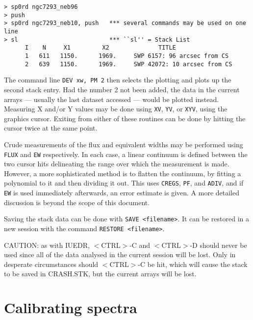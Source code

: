 \begin{verbatim}
> sp0rd ngc7293_neb96
> push
> sp0rd ngc7293_neb10, push   *** several commands may be used on one line
> sl                          *** ``sl'' = Stack List
      I    N     X1         X2              TITLE
      1   611   1150.      1969.     SWP 6157: 96 arcsec from CS
      2   639   1150.      1969.     SWP 42072: 10 arcsec from CS
\end{verbatim}

The command line \verb+DEV xw, PM 2+ then selects the plotting and plots
up the second stack entry.  Had the number 2 not been added, the data in the
current arrays --- usually the last dataset accessed --- would be plotted
instead.  Measuring X and/or Y values may be done using \verb+XV+, \verb+YV+,
or \verb+XYV+, using the graphics cursor.  Exiting from either of these
routines can be done by hitting the cursor twice at the same point.

Crude measurements of the flux and equivalent widths may be performed using
\verb+FLUX+ and \verb+EW+ respectively.  In each case, a linear continuum is
defined between the two cursor hits delineating the range over which the
measurement is made.  However, a more sophisticated method is to flatten
the continuum, by fitting a polynomial to it and then dividing it out.
This uses \verb+CREGS+, \verb+PF+, and \verb+ADIV+, and if \verb+EW+ is used
immediately afterwards, an error estimate is given.  A more detailed discussion
is beyond the scope of this document.

Saving the stack data can be done with \verb+SAVE <filename>+\@.  It can be
restored in a new session with the command \verb+RESTORE <filename>+\@.

CAUTION: as with IUEDR, $<$CTRL$>$-C and $<$CTRL$>$-D should never be used
since all of the data analysed in the current session will be lost.
Only in desperate circumstances should $<$CTRL$>$-C be hit, which will cause
the stack to be saved in CRASH.STK, but the current arrays will be lost.

\section{Calibrating spectra}


